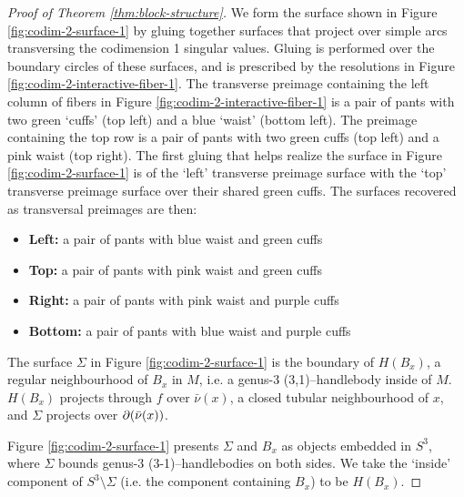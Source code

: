 \begin{proof}[Proof of Theorem \ref{thm:block-structure}]
	We form the surface shown in Figure \ref{fig:codim-2-surface-1} by gluing together surfaces that project over simple arcs transversing the codimension 1 singular values.
	Gluing is performed over the boundary circles of these surfaces, and is prescribed by the resolutions in Figure \ref{fig:codim-2-interactive-fiber-1}.
	The transverse preimage containing the left column of fibers in Figure \ref{fig:codim-2-interactive-fiber-1} is a pair of pants with two green `cuffs' (top left) and a blue `waist' (bottom left).
	The preimage containing the top row is a pair of pants with two green cuffs (top left) and a pink waist (top right).
	The first gluing that helps realize the surface in Figure \ref{fig:codim-2-surface-1} is of the `left' transverse preimage surface with the `top' transverse preimage surface over their shared green cuffs.
	The surfaces recovered as transversal preimages are then:
	


	{\renewcommand\labelitemi{}
	\begin{itemize}
		\item \textbf{Left:} a pair of pants with blue waist and green cuffs
		\item \textbf{Top:} a pair of pants with pink waist and green cuffs
		\item \textbf{Right:} a pair of pants with pink waist and purple cuffs
		\item \textbf{Bottom:} a pair of pants with blue waist and purple cuffs
	\end{itemize}
	}

	
	The surface $\Sigma$ in Figure \ref{fig:codim-2-surface-1} is the boundary of $H(B_x)$, a regular neighbourhood of $B_x$ in $M$, i.e. a genus-3 (3,1)--handlebody inside of $M$.
	$H(B_x)$ projects through $f$ over $\bar\nu(x)$, a closed tubular neighbourhood of $x$, and $\Sigma$ projects over $\partial(\bar\nu(x))$.
	
	Figure \ref{fig:codim-2-surface-1} presents $\Sigma$ and $B_x$ as objects embedded in $S^3$, where $\Sigma$ bounds genus-3 (3-1)--handlebodies on both sides.
	We take the `inside' component of $S^3\setminus\Sigma$ (i.e. the component containing $B_x$) to be $H(B_x)$.
	

\end{proof}
